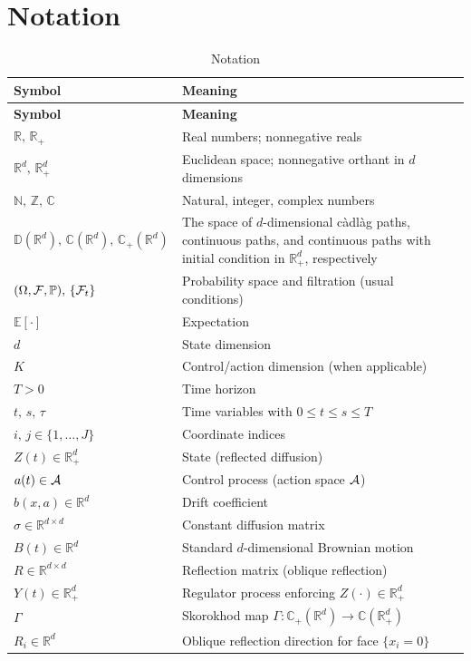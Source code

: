 \documentclass[11pt]{article}
\theoremstyle{definition}
\theoremstyle{plain}
\newcommand{\R}{\mathbb{R}}
\newcommand{\pr}{\mathbb{P}}
\newcommand{\E}{\mathbb{E}}
\newcommand{\N}{\mathbb{N}}
\newcommand{\C}{\mathbb{C}}
\newcommand{\D}{\mathbb{D}}
\newcommand{\cF}{{\cal F}}
\newcommand{\cA}{{\cal A}}
\newcommand{\Z}{\mathbb{Z}}
\begin{document}
\section*{Notation}

\renewcommand{\arraystretch}{1.15}
\begin{longtable}{@{}ll@{}}
\caption{Notation}\label{tab:notation} \\
\toprule
\textbf{Symbol} & \textbf{Meaning} \\
\midrule
\endfirsthead
\toprule
\textbf{Symbol} & \textbf{Meaning} \\
\midrule
\endhead
\bottomrule
\endfoot

$\R,\, \R_+$ & Real numbers; nonnegative reals \\
$\R^d,\, \R_+^d$ & Euclidean space; nonnegative orthant in $d$ dimensions \\
$\N,\, \Z,\, \C$ & Natural, integer, complex numbers \\
$\D(\R^d),\, \C(\R^d),\, \C_+(\R^d)$ & The space of $d$-dimensional c\`adl\`ag paths, continuous paths, and continuous paths with initial condition in $\R_+^d$, respectively \\
$(\Omega,\cF,\pr),\, \{\cF_t\}$ & Probability space and filtration (usual conditions) \\
$\E[\cdot]$ & Expectation \\

$d$ & State dimension \\
$K$ & Control/action dimension (when applicable) \\
$T>0$ & Time horizon \\
$t,\, s,\, \tau$ & Time variables with $0\le t\le s\le T$ \\
$i,\, j \in \{1,\dots,J\}$ & Coordinate indices \\

$Z(t)\in\R_+^d$ & State (reflected diffusion) \\
$a(t)\in\cA$ & Control process (action space $\cA$) \\
$b(x,a)\in\R^d$ & Drift coefficient \\
$\sigma\in\R^{d\times d}$ & Constant diffusion matrix \\
$B(t)\in\R^d$ & Standard $d$-dimensional Brownian motion \\
$R\in\R^{d\times d}$ & Reflection matrix (oblique reflection) \\
$Y(t)\in\R_+^d$ & Regulator process enforcing $Z(\cdot)\in\R_+^d$ \\
$\Gamma$ & Skorokhod map $\Gamma: \C_+(\R^d) \to \C(\R_+^d)$ \\
$R_i\in\R^d$ & Oblique reflection direction for face $\{x_i=0\}$ \\


\end{longtable}
\end{document}
